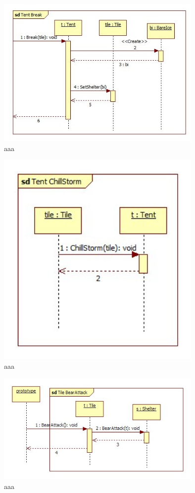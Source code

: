 \begin{figure}[H]
        \begin{center}
                \includegraphics[width=10cm]{chapters/chapter07/seqdiag/Tent_Break.jpg}
                \caption{aaa}
                \label{bbb}
        \end{center}
\end{figure}
\begin{figure}[H]
        \begin{center}
                \includegraphics[width=10cm]{chapters/chapter07/seqdiag/Tent_ChillStorm.jpg}
                \caption{aaa}
                \label{bbb}
        \end{center}
\end{figure}
\begin{figure}[H]
        \begin{center}
                \includegraphics[width=10cm]{chapters/chapter07/seqdiag/Tile_BearAttack.jpg}
                \caption{aaa}
                \label{bbb}
        \end{center}
\end{figure}
